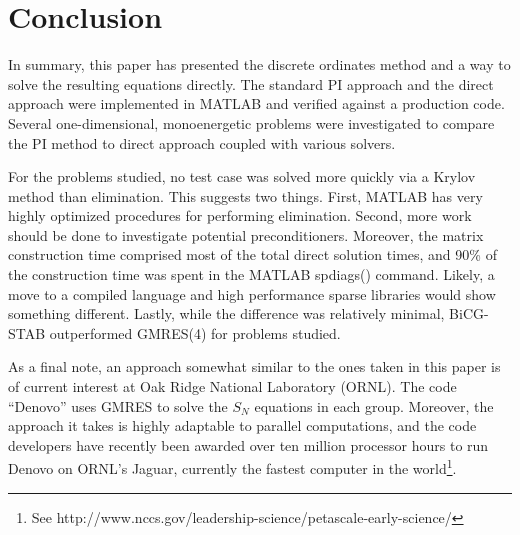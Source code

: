 \documentclass[final,3p,times,11pt]{elsarticle}
\begin{document}
\section{Conclusion}

In summary, this paper has presented the discrete ordinates method and a way to solve the resulting equations directly.  The standard PI approach and the direct approach were implemented in MATLAB and verified against a production code.  Several one-dimensional, monoenergetic problems were investigated to compare the PI method to direct approach coupled with various solvers.  

For the problems studied, no test case was solved more quickly via a Krylov method than elimination.  This suggests two things. First, MATLAB has very highly optimized procedures for performing elimination.  Second, more work should be done to investigate potential preconditioners.  Moreover, the matrix construction time comprised most of the total direct solution times, and 90\% of the construction time was spent in the MATLAB {\sf spdiags()} command.  Likely, a move to a compiled language and high performance sparse libraries would show something different. Lastly, while the difference was relatively minimal, BiCG-STAB outperformed GMRES(4) for problems studied.

As a final note, an approach somewhat similar to the ones taken in this paper is of current interest at Oak Ridge National Laboratory (ORNL).  The code ``Denovo'' uses GMRES to solve the $S_N$ equations in each group\cite{peplow2009sot}.  Moreover, the approach it takes is highly adaptable to parallel computations, and the code developers have recently been awarded over ten million processor hours to run Denovo on ORNL's Jaguar, currently the fastest computer in the world\footnote{See http://www.nccs.gov/leadership-science/petascale-early-science/}.



\end{document}
